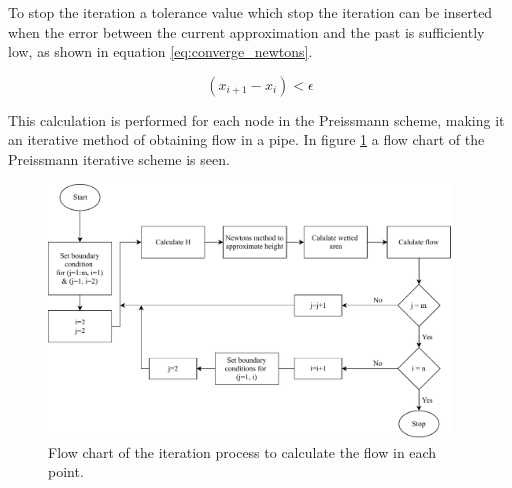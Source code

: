 
To stop the iteration a tolerance value which stop the iteration can be inserted when the error between the current approximation and the past is sufficiently low, as shown in equation \ref{eq:converge_newtons}.

\begin{equation}\label{eq:converge_newtons}
     \left( x_{i+1}-x_i \right) < \epsilon 
\end{equation}


This calculation is performed for each node in the Preissmann scheme, making it an iterative method of obtaining flow in a pipe. 
In figure \ref{fig:flow_chart_iteration} a flow chart of the Preissmann iterative scheme is seen.
\begin{figure}[H]
    \centering
    \includegraphics[width=0.95\textwidth]{report/simulation/pictures/flow_chart_iteration.pdf}
    \caption{Flow chart of the iteration process to calculate the flow in each point.}
    \label{fig:flow_chart_iteration}
\end{figure}

